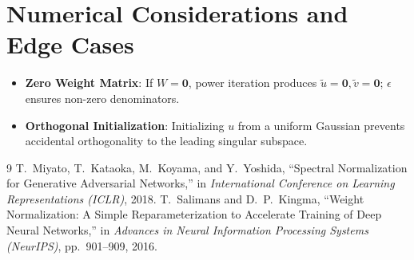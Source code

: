 \documentclass[11pt,a4paper]{article}
\theoremstyle{definition}
\begin{document}
\section{Numerical Considerations and Edge Cases}

\begin{itemize}
    \item \textbf{Zero Weight Matrix}: If $W = \mathbf{0}$, power iteration produces $\tilde{u} = \mathbf{0}, \tilde{v} = \mathbf{0}$; $\epsilon$ ensures non-zero denominators.
    \item \textbf{Orthogonal Initialization}: Initializing $u$ from a uniform Gaussian prevents accidental orthogonality to the leading singular subspace.
\end{itemize}

\begin{thebibliography}{9}
 T.~Miyato, T.~Kataoka, M.~Koyama, and Y.~Yoshida, ``Spectral Normalization for Generative Adversarial Networks,'' in \emph{International Conference on Learning Representations (ICLR)}, 2018.
 T.~Salimans and D.~P.~Kingma, ``Weight Normalization: A Simple Reparameterization to Accelerate Training of Deep Neural Networks,'' in \emph{Advances in Neural Information Processing Systems (NeurIPS)}, pp.~901--909, 2016.
\end{thebibliography}
\end{document}

